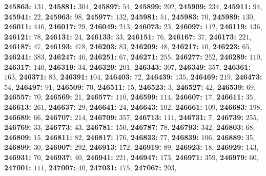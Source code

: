 \textsf{\bfseries 245863:} $131$, \textsf{\bfseries 245881:} $304$, \textsf{\bfseries 245897:} $54$, \textsf{\bfseries 245899:} $202$, \textsf{\bfseries 245909:} $234$, \textsf{\bfseries 245911:} $94$, \textsf{\bfseries 245941:} $22$, \textsf{\bfseries 245963:} $98$, \textsf{\bfseries 245977:} $132$, \textsf{\bfseries 245981:} $51$, \textsf{\bfseries 245983:} $70$, \textsf{\bfseries 245989:} $130$, \textsf{\bfseries 246011:} $446$, \textsf{\bfseries 246017:} $29$, \textsf{\bfseries 246049:} $213$, \textsf{\bfseries 246073:} $23$, \textsf{\bfseries 246097:} $112$, \textsf{\bfseries 246119:} $136$, \textsf{\bfseries 246121:} $78$, \textsf{\bfseries 246131:} $24$, \textsf{\bfseries 246133:} $33$, \textsf{\bfseries 246151:} $76$, \textsf{\bfseries 246167:} $37$, \textsf{\bfseries 246173:} $221$, \textsf{\bfseries 246187:} $47$, \textsf{\bfseries 246193:} $478$, \textsf{\bfseries 246203:} $83$, \textsf{\bfseries 246209:} $48$, \textsf{\bfseries 246217:} $10$, \textsf{\bfseries 246223:} $65$, \textsf{\bfseries 246241:} $383$, \textsf{\bfseries 246247:} $46$, \textsf{\bfseries 246251:} $67$, \textsf{\bfseries 246271:} $255$, \textsf{\bfseries 246277:} $252$, \textsf{\bfseries 246289:} $110$, \textsf{\bfseries 246317:} $140$, \textsf{\bfseries 246319:} $34$, \textsf{\bfseries 246329:} $201$, \textsf{\bfseries 246343:} $307$, \textsf{\bfseries 246349:} $357$, \textsf{\bfseries 246361:} $163$, \textsf{\bfseries 246371:} $83$, \textsf{\bfseries 246391:} $104$, \textsf{\bfseries 246403:} $72$, \textsf{\bfseries 246439:} $135$, \textsf{\bfseries 246469:} $219$, \textsf{\bfseries 246473:} $54$, \textsf{\bfseries 246497:} $91$, \textsf{\bfseries 246509:} $70$, \textsf{\bfseries 246511:} $15$, \textsf{\bfseries 246523:} $3$, \textsf{\bfseries 246527:} $42$, \textsf{\bfseries 246539:} $69$, \textsf{\bfseries 246557:} $70$, \textsf{\bfseries 246569:} $21$, \textsf{\bfseries 246577:} $110$, \textsf{\bfseries 246599:} $114$, \textsf{\bfseries 246607:} $17$, \textsf{\bfseries 246611:} $35$, \textsf{\bfseries 246613:} $261$, \textsf{\bfseries 246637:} $29$, \textsf{\bfseries 246641:} $24$, \textsf{\bfseries 246643:} $102$, \textsf{\bfseries 246661:} $109$, \textsf{\bfseries 246683:} $198$, \textsf{\bfseries 246689:} $66$, \textsf{\bfseries 246707:} $214$, \textsf{\bfseries 246709:} $357$, \textsf{\bfseries 246713:} $111$, \textsf{\bfseries 246731:} $7$, \textsf{\bfseries 246739:} $255$, \textsf{\bfseries 246769:} $33$, \textsf{\bfseries 246773:} $43$, \textsf{\bfseries 246781:} $150$, \textsf{\bfseries 246787:} $78$, \textsf{\bfseries 246793:} $342$, \textsf{\bfseries 246803:} $68$, \textsf{\bfseries 246809:} $15$, \textsf{\bfseries 246811:} $82$, \textsf{\bfseries 246817:} $176$, \textsf{\bfseries 246833:} $77$, \textsf{\bfseries 246839:} $106$, \textsf{\bfseries 246889:} $35$, \textsf{\bfseries 246899:} $30$, \textsf{\bfseries 246907:} $292$, \textsf{\bfseries 246913:} $172$, \textsf{\bfseries 246919:} $89$, \textsf{\bfseries 246923:} $18$, \textsf{\bfseries 246929:} $143$, \textsf{\bfseries 246931:} $70$, \textsf{\bfseries 246937:} $40$, \textsf{\bfseries 246941:} $221$, \textsf{\bfseries 246947:} $173$, \textsf{\bfseries 246971:} $359$, \textsf{\bfseries 246979:} $60$, \textsf{\bfseries 247001:} $111$, \textsf{\bfseries 247007:} $40$, \textsf{\bfseries 247031:} $175$, \textsf{\bfseries 247067:} $203$, 
